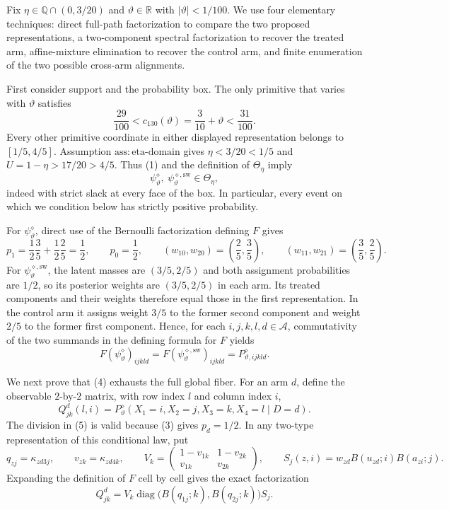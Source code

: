 Fix \(\eta\in\mathbb Q\cap(0,3/20)\) and \(\vartheta\in\mathbb R\) with \(|\vartheta|<1/100\).  We use four elementary techniques: direct full-path factorization to compare the two proposed representations, a two-component spectral factorization to recover the treated arm, affine-mixture elimination to recover the control arm, and finite enumeration of the two possible cross-arm alignments.

First consider support and the probability box.  The only primitive that varies with \(\vartheta\) satisfies
\[
 \frac{29}{100}<c_{130}(\vartheta)=\frac{3}{10}+\vartheta<\frac{31}{100}.
 \tag{1}
\]
Every other primitive coordinate in either displayed representation belongs to \([1/5,4/5]\).  Assumption \(\mathrm{ass{:}eta\text{-}domain}\) gives \(\eta<3/20<1/5\) and \(U=1-\eta>17/20>4/5\).  Thus (1) and the definition of \(\Theta_\eta\) imply
\[
 \psi^{\diamond}_{\vartheta},\ \psi^{\diamond,\mathrm{sw}}_{\vartheta}\in\Theta_\eta,
 \tag{2}
\]
indeed with strict slack at every face of the box.  In particular, every event on which we condition below has strictly positive probability.

For \(\psi^{\diamond}_{\vartheta}\), direct use of the Bernoulli factorization defining \(F\) gives
\[
 p_1=\frac12\frac35+\frac12\frac25=\frac12,
 \qquad p_0=\frac12,
 \qquad (w_{10},w_{20})=\left(\frac25,\frac35\right),
 \qquad (w_{11},w_{21})=\left(\frac35,\frac25\right).
 \tag{3}
\]
For \(\psi^{\diamond,\mathrm{sw}}_{\vartheta}\), the latent masses are \((3/5,2/5)\) and both assignment probabilities are \(1/2\), so its posterior weights are \((3/5,2/5)\) in each arm.  Its treated components and their weights therefore equal those in the first representation.  In the control arm it assigns weight \(3/5\) to the former second component and weight \(2/5\) to the former first component.  Hence, for each \(i,j,k,l,d\in\mathcal A\), commutativity of the two summands in the defining formula for \(F\) yields
\[
 F(\psi^{\diamond}_{\vartheta})_{ijkld}
 =F(\psi^{\diamond,\mathrm{sw}}_{\vartheta})_{ijkld}
 =P^{\diamond}_{\vartheta,ijkld}.
 \tag{4}
\]

We next prove that (4) exhausts the full global fiber.  For an arm \(d\), define the observable \(2\)-by-\(2\) matrix, with row index \(l\) and column index \(i\),
\[
 Q_{jk}^{d}(l,i)
 =P^{\diamond}_{\vartheta}(X_1=i,X_2=j,X_3=k,X_4=l\mid D=d).
 \tag{5}
\]
The division in (5) is valid because (3) gives \(p_d=1/2\).  In any two-type representation of this conditional law, put
\[
 q_{zj}=\kappa_{zd3j},\qquad v_{zk}=\kappa_{zd4k},\qquad
 V_k=\begin{pmatrix}1-v_{1k}&1-v_{2k}\\ v_{1k}&v_{2k}\end{pmatrix},
 \qquad S_j(z,i)=w_{zd}B(u_{zd};i)B(a_{zi};j).
 \tag{6}
\]
Expanding the definition of \(F\) cell by cell gives the exact factorization
\[
 Q_{jk}^{d}
 =V_k\operatorname{diag}\!\bigl(B(q_{1j};k),B(q_{2j};k)\bigr)S_j.
 \tag{7}
\]

